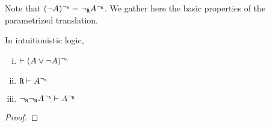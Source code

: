 Note that $(\neg A)^{\neg_{\texttt{R}}} = \neg_{\texttt{R}} A^{\neg_{\texttt{R}}}$. We gather here the basic properties of the parametrized translation.

\begin{proposition}
    In intuitionistic logic,
    \begin{enumerate}[(i)]
        \item $\vdash (A\vee \neg A)^{\neg_{\texttt{R}}}$
        \item $\texttt{R} \vdash A^{\neg_{\texttt{R}}}$
        \item $\neg_{\texttt{R}}\neg_{\texttt{R}} A^{\neg_{\texttt{R}}} \vdash A^{\neg_{\texttt{R}}}$
    \end{enumerate}
\end{proposition}
\begin{proof}
    
\end{proof}



